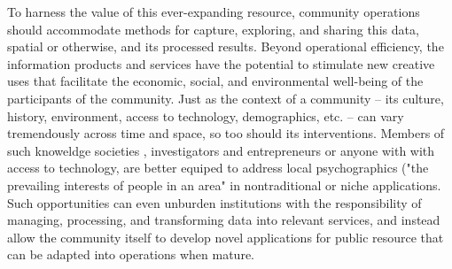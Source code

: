To harness the value of this ever-expanding resource, community operations should accommodate methods for capture, exploring, and sharing this data, spatial or otherwise, and its processed results\cite{Roche2012}.%
Beyond operational efficiency, the information products and services have the potential to stimulate new creative uses that facilitate the economic, social, and environmental well-being of the participants of the community\cite{Rajabifard2009}. %
Just as the context of a community -- its culture, history, environment, access to technology, demographics, etc. -- can vary tremendously across time and space, so too should its interventions\cite{Afzalan2017}. %
Members of such knoweldge societies\cite{Rivera2020} %
, investigators and entrepreneurs or anyone with with access to technology, are better equiped to address local psychographics ("the prevailing interests of people in an area"\cite{Chiappinelli2020} %
in nontraditional or niche applications\cite{McQueenBaker2019}.  %
Such opportunities can even unburden institutions with the responsibility of managing, processing, and transforming data into relevant services, and instead allow the community itself to develop novel applications for public resource that can be adapted into operations when mature.

